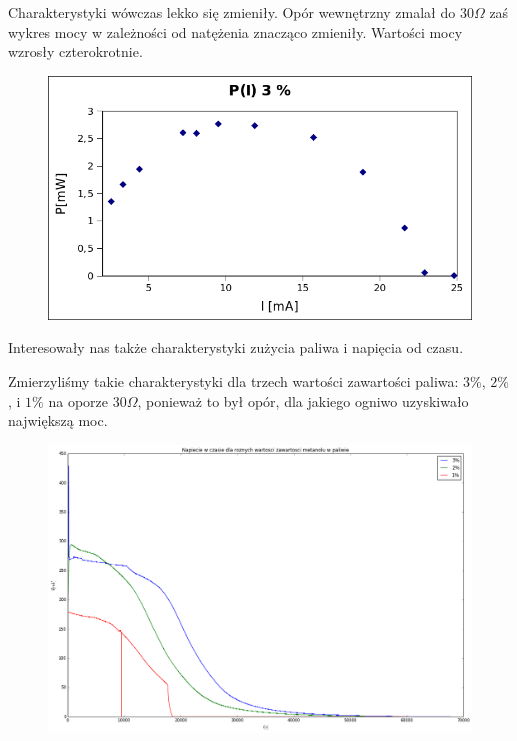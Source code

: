 \documentclass[a4paper,12pt]{article}
\begin{document}
Charakterystyki wówczas lekko się zmieniły. Opór wewnętrzny zmalał do $30 \Omega $ zaś wykres mocy w zależności od natężenia znacząco zmieniły. Wartości mocy wzrosły czterokrotnie. 
\begin{figure} [H]
 \begin{center}
    \includegraphics[width = 15cm]{po.png}
  \end{center}
\end{figure}

Interesowały nas także charakterystyki zużycia paliwa i napięcia od czasu.

Zmierzyliśmy takie charakterystyki dla trzech wartości zawartości paliwa: $3\%$, $2\%$, i $1\%$ na oporze $30 \Omega $, ponieważ to był opór, dla jakiego ogniwo uzyskiwało największą moc. 

\begin{figure} [H]
 \begin{center}
    \includegraphics[width = 15cm]{DMFC_U(T).png}
  \end{center}
\end{figure}
\end{document}
